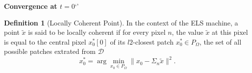 \documentclass[a4paper,10pt]{article}
\theoremstyle{definition} %
\newtheorem{definition}{Definition}[section]
\theoremstyle{definition} %
\theoremstyle{definition} %
\theoremstyle{definition} %
\newcommand{\x}{\boldsymbol{x}}
\newcommand{\0}{\boldsymbol{0}}
\begin{document}

    

    
    
    


{\large \textbf{Convergence at $t = 0$}}`'
\begin{definition}[Locally Coherent Point]
    In the context of the ELS machine, a point $\tilde{x}$ is said to be locally coherent if 
    for every pixel $n$, the value $\tilde{x}$ at this pixel is equal to the central pixel $x_0^*[0]$ of its $l2$-closest patch $x_0^* \in P_\Omega$, the set of all possible patches extrated from $\mathcal{D}$
    \[
        x_0^* = \arg \min_{x_0 \in P_{\Omega}} \|x_0 - \Sigma_n \tilde{x}\|^2.
    \]
\end{definition}
\end{document}
